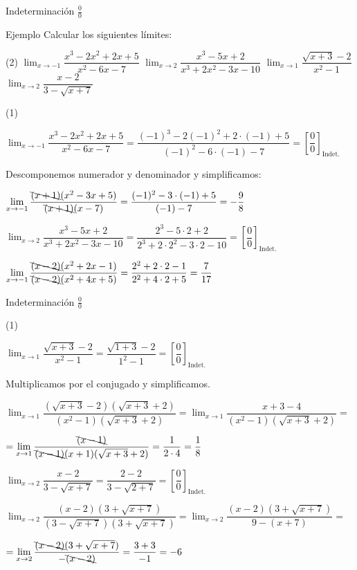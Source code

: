 \documentclass[8pt]{beamer}
\newcommand{\limite}[2]{\displaystyle \lim_{x \rightarrow #1}{#2}}
\begin{document}
\begin{frame}{Indeterminación $\frac{0}{0}$}
\begin{exampleblock}{Ejemplo}
Calcular los siguientes límites:
\begin{tasks}[label=\alph*)](2)
\task $\limite{-1}{\dfrac{x^3-2x^2+2x+5}{x^2-6x-7}}$
\task $\limite{2}{\dfrac{x^3-5x+2}{x^3+2x^2-3x-10}}$
\task $\limite{1}{\dfrac{\sqrt{x+3}-2}{x^2-1}}$
\task $\limite{2}{\dfrac{x-2}{3-\sqrt{x+7}}}$
\end{tasks}
\end{exampleblock}

\begin{tasks}[label=\alph* )](1)

\task $\limite{-1}{\dfrac{x^3-2x^2+2x+5}{x^2-6x-7}} = \dfrac{(-1)^3-2(-1)^2+2\cdot(-1)+5}{(-1)^2-6\cdot (-1)-7} = \left[\dfrac{0}{0}\right]_{\text{Indet.}}$

Descomponemos numerador y denominador y simplificamos:

$\limite{-1}{\dfrac{\bcancel{(x+1)}(x^2-3x+5)}{\bcancel{(x+1)}(x-7)}} = \dfrac{(-1)^2-3\cdot(-1)+5}{ (-1)-7}=-\dfrac{9}{8}$ 

\task $\limite{2}{\dfrac{x^3-5x+2}{x^3+2x^2-3x-10}}= \dfrac{2^3-5 \cdot 2+2}{2^3+2\cdot 2^2-3\cdot 2-10}= \left[\dfrac{0}{0}\right]_{\text{Indet.}} $

$\limite{-1}{\dfrac{\bcancel{(x-2)}(x^2+2x-1)}{\bcancel{(x-2)}(x^2+4x+5)}} = \dfrac{2^2+2\cdot2-1}{ 2^2+4\cdot 2 +5}=\dfrac{7}{17}$ 
\end{tasks}
\end{frame}

\begin{frame}{Indeterminación $\frac{0}{0}$}
\begin{tasks}[label=\alph*),resume](1)

\task $\limite{1}{\dfrac{\sqrt{x+3}-2}{x^2-1}} = \dfrac{\sqrt{1+3}-2}{1^2-1} = \left[\dfrac{0}{0}\right]_{\text{Indet.}} $

\vspace{10pt}
Multiplicamos por el conjugado y simplificamos.

\vspace{10pt}
$\limite{1}{\dfrac{(\sqrt{x+3}-2)(\sqrt{x+3}+2)}{(x^2-1)(\sqrt{x+3}+2)}} = \limite{1}{\dfrac{x+3-4}{(x^2-1)(\sqrt{x+3}+2)}} = $

\vspace{10pt}
$= \limite{1}{\dfrac{\bcancel{(x-1)}}{\bcancel{(x-1)}(x+1)(\sqrt{x+3}+2)}}= \dfrac{1}{2 \cdot 4}= \dfrac{1}{8}$

\task  $\limite{2}{\dfrac{x-2}{3-\sqrt{x+7}}} =  \dfrac{2-2}{3-\sqrt{2+7}} =  \left[\dfrac{0}{0}\right]_{\text{Indet.}}$

\vspace{10pt}
$\limite{2}{\dfrac{(x-2)(3+\sqrt{x+7})}{(3-\sqrt{x+7})(3+\sqrt{x+7})}}= \limite{2}{\dfrac{(x-2)(3+\sqrt{x+7})}{9-(x+7)}}= $

\vspace{10pt}
$= \limite{2}{\dfrac{\bcancel{(x-2)}(3+\sqrt{x+7})}{-\bcancel{(x-2)}}} = \dfrac{3+3}{-1}= -6 $

\end{tasks}

\end{frame}
\end{document}
